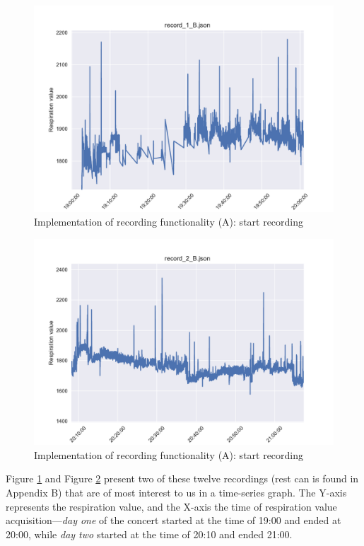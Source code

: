 \begin{figure}[!h]
    \centering
    \includegraphics[scale=0.5]{images/Record_1_B.pdf}
    \caption{Implementation of recording functionality (A): start recording}
    \label{fig:day_1}
\end{figure}

\begin{figure}[!h]
    \centering
    \includegraphics[scale=0.5]{images/Record_2_B.pdf}
    \caption{Implementation of recording functionality (A): start recording}
    \label{fig:day_2}
\end{figure}



Figure \ref{fig:day_1} and Figure \ref{fig:day_2} present two of these twelve recordings (rest can is found in Appendix B) that are of most interest to us in a time-series graph. The Y-axis represents the respiration value, and the X-axis the time of respiration value acquisition---\textit{day one} of the concert started at the time of 19:00 and ended at 20:00, while \textit{day two} started at the time of 20:10 and ended 21:00.

